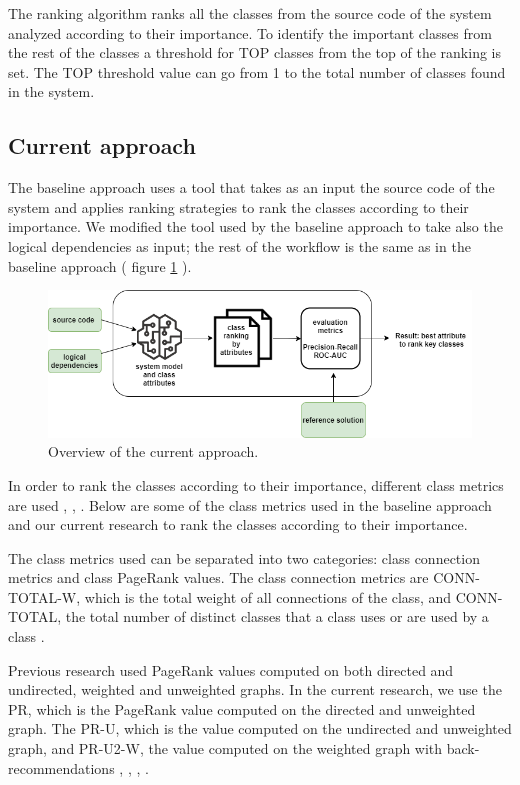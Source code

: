 \documentclass[runningheads]{comsis2}
\begin{document}
The ranking algorithm ranks all the classes from the source code of the system analyzed according to their importance. To identify the important classes from the rest of the classes a threshold for TOP classes from the top of the ranking is set. The TOP threshold value can go from 1 to the total number of classes found in the system. 



\subsection{Current approach}

The baseline approach uses a tool that takes as an input the source code of the system and applies ranking strategies to rank the classes according to their importance. We modified the tool used by the baseline approach to take also the logical dependencies as input; the rest of the workflow is the same as in the baseline approach ( figure \ref{fig:baseline_approach} ).

\begin{figure}
\centering
\includegraphics[width=\textwidth]{current_approach.PNG}
\caption{Overview of the current approach.}
\label{fig:baseline_approach}
\centering
\end{figure}
In order to rank the classes according to their importance, different class metrics are used \cite{Ding2016AnIA}, \cite{ZaidmanJurnal}, \cite{PAN2018188}. Below are some of the class metrics used in the baseline approach and our current research to rank the classes according to their importance. 

The class metrics used can be separated into two categories: class connection metrics and class PageRank values.
The class connection metrics are CONN-TOTAL-W, which is the total weight of all connections of the class, and CONN-TOTAL, the total number of distinct classes that a class uses or are used by a class \cite{Finding-key-classes}.

Previous research used PageRank values computed on both directed and undirected, weighted and unweighted graphs. In the current research, we use the PR, which is the PageRank value computed on the directed and unweighted graph. The PR-U, which is the value computed on the undirected and unweighted graph, and PR-U2-W, the value computed on the weighted graph with back-recommendations \cite{PagerankENASE}, \cite{enase15}, \cite{Finding-key-classes}, \cite{PagerankSACI}.
\end{document}

